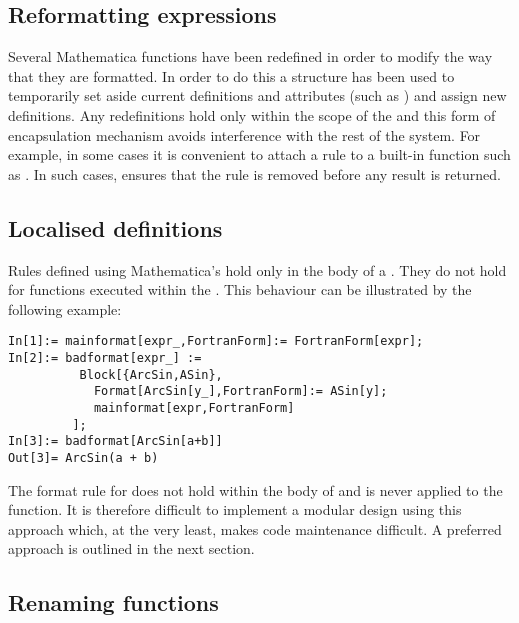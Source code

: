 \documentclass [12pt,twoside]{article}
\begin{document}
\pagebreak[2]

\subsection{Reformatting expressions}

Several Mathematica functions have been redefined in order to modify the way
that they are formatted. In order to do this a  structure has been
used to temporarily set aside current definitions and attributes (such as
) and assign new definitions. Any redefinitions hold only within
the scope of the  and this form of encapsulation mechanism avoids
interference with the rest of the system. For example, in some cases it is
convenient to attach a rule to a built-in function such as . In such
cases,  ensures that the rule is removed before any result is returned.

\subsection{Localised definitions}
Rules defined using Mathematica's  hold only in the body of a
. They do not hold for functions executed within the .
This behaviour can be illustrated by the following example:
\begin{verbatim}
In[1]:= mainformat[expr_,FortranForm]:= FortranForm[expr];
In[2]:= badformat[expr_] :=
          Block[{ArcSin,ASin},
            Format[ArcSin[y_],FortranForm]:= ASin[y];
            mainformat[expr,FortranForm]
         ];
In[3]:= badformat[ArcSin[a+b]]
Out[3]= ArcSin(a + b)
\end{verbatim}
The format rule for  does not hold within the body of 
and is never applied to the function. It is therefore difficult to implement a
modular design using this approach which, at the very least, makes code
maintenance difficult. A preferred approach is outlined in the next section.

\pagebreak[2]

\subsection{Renaming functions}
\end{document}

